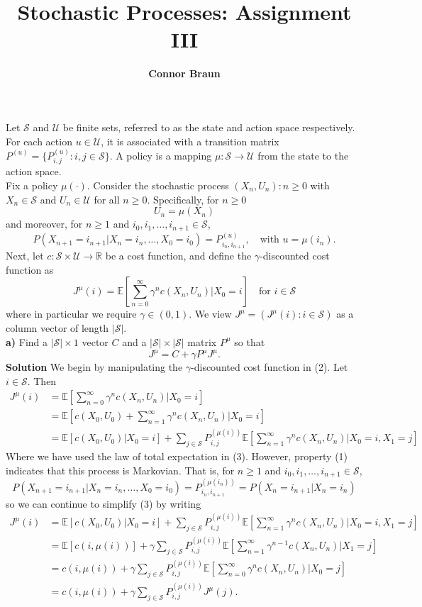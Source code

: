 \documentclass[11pt, letterpaper]{article}
\title{\bf Stochastic Processes: Assignment III}
\author{\bf Connor Braun}
\date{}
\newcommand{\mbb}[1]{\mathbb{#1}}
\newcommand{\mc}[1]{\mathcal{#1}}
\begin{document}
    
    \maketitle
     Let $\mc{S}$ and $\mc{U}$ be finite sets, referred to as the state and action space respectively.
    For each action $u\in\mc{U}$, it is associated with a transition matrix $P^{(u)}=\{P_{i,j}^{(u)}:i,j\in\mc{S}\}$. A policy is a mapping
    $\mu:\mc{S}\rightarrow\mc{U}$ from the state to the action space.\\[10pt]
    Fix a policy $\mu(\cdot)$. Consider the stochastic process ${(X_n,U_n):n\geq 0}$ with $X_n\in\mc{S}$ and $U_n\in\mc{U}$ for all $n\geq 0$.
    Specifically, for $n\geq 0$
    \[U_n=\mu(X_n)\]
    and moreover, for $n\geq 1$ and $i_0,i_1,\dots,i_{n+1}\in\mc{S}$,
    \[P(X_{n+1}=i_{n+1}|X_n=i_n,\dots,X_0=i_0)=P^{(u)}_{i_n,i_{n+1}},\quad\text{with $u=\mu(i_n)$}.\tag{1}\]
    Next, let $c:\mc{S}\times\mc{U}\rightarrow\mbb{R}$ be a cost function, and define the $\gamma$-discounted cost function as
    \[J^\mu(i)=\mbb{E}\left[\sum_{n=0}^\infty\gamma^nc(X_n,U_n)\bigg|X_0=i\right]\quad\text{for $i\in\mc{S}$}\tag{2}\]
    where in particular we require $\gamma\in(0,1)$. We view $J^\mu=(J^\mu(i):i\in\mc{S})$ as a column vector of length $|\mc{S}|$.\\[10pt]
    {\bf a)} Find a $|\mc{S}|\times 1$ vector $C$ and a $|\mc{S}|\times|\mc{S}|$ matrix $P^\mu$ so that
    \[J^\mu=C+\gamma P^\mu J^\mu.\]
    {\bf Solution} We begin by manipulating the $\gamma$-discounted cost function in (2). Let $i\in \mc{S}$. Then
    \begin{align*}
        J^\mu(i)&=\mbb{E}\left[\sum_{n=0}^\infty\gamma^n c(X_n,U_n)\bigg|X_0=i\right]\\
        &=\mbb{E}\left[c(X_0,U_0)+\sum_{n=1}^\infty\gamma^n c(X_n,U_n)\bigg|X_0=i\right]\\
        &=\mbb{E}[c(X_0,U_0)|X_0=i]+\sum_{j\in \mc{S}}P_{i,j}^{(\mu(i))}\mbb{E}\left[\sum_{n=1}^\infty\gamma^n c(X_n,U_n)\bigg|X_0=i,X_1=j\right]\tag{3}
    \end{align*}
    Where we have used the law of total expectation in (3). However, property (1) indicates that this process is Markovian. That is, for $n\geq 1$ and $i_0,i_1,\dots,i_{n+1}\in\mc{S}$,
    \[P(X_{n+1}=i_{n+1}|X_n=i_n,\dots,X_0=i_0)=P^{(\mu(i_n))}_{i_n,i_{n+1}}=P(X_n=i_{n+1}|X_n=i_n)\]
    so we can continue to simplify (3) by writing
    \begin{align*}
        J^\mu(i)&=\mbb{E}[c(X_0,U_0)|X_0=i]+\sum_{j\in \mc{S}}P_{i,j}^{(\mu(i))}\mbb{E}\left[\sum_{n=1}^\infty\gamma^n c(X_n,U_n)\bigg|X_0=i,X_1=j\right]\\
        &=\mbb{E}[c(i,\mu(i))]+\gamma\sum_{j\in \mc{S}}P_{i,j}^{(\mu(i))}\mbb{E}\left[\sum_{n=1}^\infty\gamma^{n-1}c(X_n,U_n)\bigg|X_1=j\right]\\
        &=c(i,\mu(i))+\gamma\sum_{j\in \mc{S}}P_{i,j}^{(\mu(i))}\mbb{E}\left[\sum_{n=0}^\infty\gamma^{n}c(X_n,U_n)\bigg|X_0=j\right]\\
        &=c(i,\mu(i))+\gamma\sum_{j\in\mc{S}}P_{i,j}^{(\mu(i))}J^\mu(j).
    \end{align*}
\end{document}
